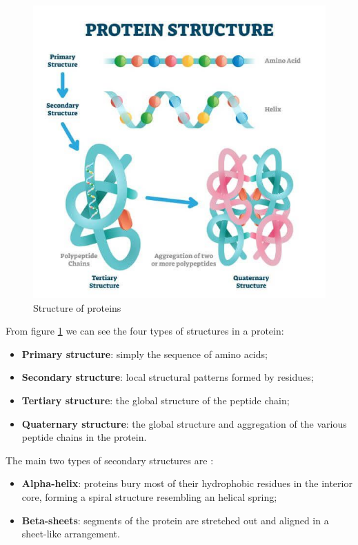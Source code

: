 \begin{figure}[h!]
	\includegraphics[scale=0.75]{res/proteins_overview/protein_structure.png}
	\centering
	\caption{Structure of proteins}
	\label{fig:protein-structure}
\end{figure}

From figure \ref{fig:protein-structure} we can see the four types of structures in a protein:

\begin{itemize}
	\item \textbf{Primary structure}: simply the sequence of amino acids;
	\item \textbf{Secondary structure}: local structural patterns formed by residues;
	\item \textbf{Tertiary structure}: the global structure of the peptide chain;
	\item \textbf{Quaternary structure}: the global structure and aggregation of the various peptide chains in the protein. 
\end{itemize}

\vspace{2em}

The main two types of secondary structures are :

\begin{itemize}
	\item \textbf{Alpha-helix}: proteins bury most of their hydrophobic residues in the interior core, forming a spiral structure resembling an helical spring;
	\item \textbf{Beta-sheets}: segments of the protein are stretched out and aligned in a sheet-like arrangement.
\end{itemize}
\vspace{6em}
\pagebreak
